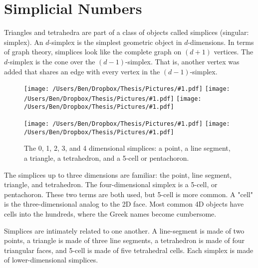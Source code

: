 \documentclass[12pt]{scrippsthesis}
\newcommand{\pic}[2]{\texttt{[image: /Users/Ben/Dropbox/Thesis/Pictures/\#1.pdf]}}
\newcommand{\mchoose}[2]{{\textstyle \left( \! {#1 \choose #2} \! \right)}}
\theoremstyle{definition}
\theoremstyle{remark}
\theoremstyle{plain}
\begin{document}
\section{Simplicial Numbers}

Triangles and tetrahedra are part of a class of objects called simplices (singular: simplex).  An $d$-simplex is the simplest geometric object in $d$-dimensions.  In terms of graph theory, simplices look like the complete graph on $(d+1)$ vertices.  The $d$-simplex is the cone over the $(d-1)$-simplex.  That is, another vertex was added that shares an edge with every vertex in the $(d-1)$-simplex.

\begin{figure}[H]
\centerline{\hfill
\pic{s0}{scale=.5}\hfill
\pic{s1}{scale=.5}\hfill
\pic{s2}{scale=.5}\hfill
}
\centerline{\hfill
\pic{s3}{scale=.5}\hfill
\pic{s4}{scale=.5}\hfill
}
\caption{The 0, 1, 2, 3, and 4 dimensional simplices:  a point, a line segment, a triangle, a tetrahedron, and a 5-cell or pentachoron.}
\end{figure}


%

The simplices up to three dimensions are familiar: the point, line segment, triangle, and tetrahedron.  The four-dimensional simplex is a 5-cell, or pentachoron.  These two terms are both used, but 5-cell is more common.  A "cell" is the three-dimensional analog to the 2D face. Most common 4D objects have cells into the hundreds, where the Greek names become cumbersome.

Simplices are intimately related to one another.  A line-segment is made of two points, a triangle is made of three line segments, a tetrahedron is made of four triangular faces, and 5-cell is made of five tetrahedral cells.  Each simplex is made of lower-dimensional simplices.
\end{document}
